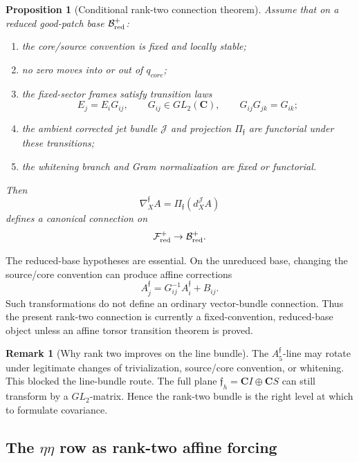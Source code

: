 \documentclass[11pt,a4paper]{amsart}
\def\core{core}%
\theoremstyle{plain}
\newtheorem{proposition}[theorem]{Proposition}
\theoremstyle{definition}
\newtheorem{remark}[theorem]{Remark}
\newcommand{\core}{\mathrm{core}}
\begin{document}
\begin{proposition}[Conditional rank-two connection theorem]
\label{prop:conditional-rank-two-connection}
Assume that on a reduced good-patch base \(\mathcal B_{\rm red}^{+}\):
\begin{enumerate}
\item the core/source convention is fixed and locally stable;
\item no zero moves into or out of \(q_{\core}\);
\item the fixed-sector frames satisfy transition laws
\[
E_j=E_iG_{ij},
\qquad
G_{ij}\in GL_2(\mathbf C),
\qquad
G_{ij}G_{jk}=G_{ik};
\]
\item the ambient corrected jet bundle \(\mathcal J\) and projection
\(\Pi_{\mathfrak f}\) are functorial under these transitions;
\item the whitening branch and Gram normalization are fixed or functorial.
\end{enumerate}
Then
\[
\nabla_X^{\mathfrak f}A
=
\Pi_{\mathfrak f}(d_X^{\mathcal J}A)
\]
defines a canonical connection on
\[
\mathcal F_{\rm red}^{+}\to\mathcal B_{\rm red}^{+}.
\]
\end{proposition}

The reduced-base hypotheses are essential.  On the unreduced base, changing the
source/core convention can produce affine corrections
\[
A_j^{\mathfrak f}
=
G_{ij}^{-1}A_i^{\mathfrak f}
+
B_{ij}.
\]
Such transformations do not define an ordinary vector-bundle connection.  Thus
the present rank-two connection is currently a fixed-convention, reduced-base
object unless an affine torsor transition theorem is proved.

\begin{remark}[Why rank two improves on the line bundle]
\label{rem:rank-two-improves-on-line-bundle}
The \(A_5^{\mathfrak f}\)-line may rotate under legitimate changes of
trivialization, source/core convention, or whitening.  This blocked the
line-bundle route.  The full plane \(\mathfrak f_h=\mathbf C I\oplus\mathbf C S\)
can still transform by a \(GL_2\)-matrix.  Hence the rank-two bundle is the
right level at which to formulate covariance.
\end{remark}

\subsection{The \(\eta\eta\) row as rank-two affine forcing}
\label{subsec:etaeta-row-rank-two-affine-forcing}
\end{document}
